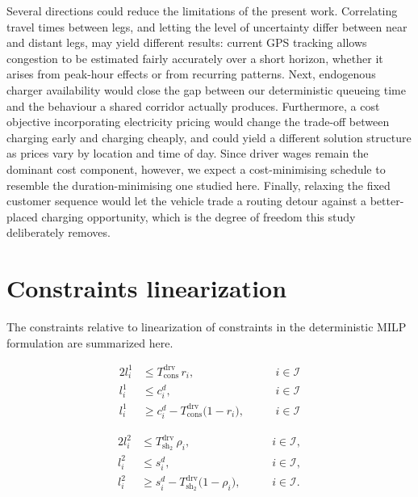 \documentclass[preprint,12pt,3p]{elsarticle}
\begin{document}
Several directions could reduce the limitations of the present work. Correlating travel times between legs, and letting the level of uncertainty differ between near and distant legs, may yield different results: current GPS tracking allows congestion to be estimated fairly accurately over a short horizon, whether it arises from peak-hour effects or from recurring patterns.
Next, endogenous charger availability would close the gap between our deterministic queueing time and the behaviour a shared corridor actually produces.
Furthermore, a cost objective incorporating electricity pricing would change the trade-off between charging early and charging cheaply, and could yield a different solution structure as prices vary by location and time of day. Since driver wages remain the dominant cost component, however, we expect a cost-minimising schedule to resemble the duration-minimising one studied here.
Finally, relaxing the fixed customer sequence would let the vehicle trade a routing detour against a better-placed charging opportunity, which is the degree of freedom this study deliberately removes.



\appendix
\section{Constraints linearization} \label{section:appendix1}
The constraints relative to linearization of constraints in the deterministic MILP formulation are summarized here.

\begin{alignat}{2}
    l_i^1 &\leq T^{\mathrm{drv}}_{\mathrm{cons}}\, r_i,
    &\quad& \, i \in \mathcal{I} \label{eq:l1_ub1}\\
    l_i^1 &\leq c_i^d,
    &\quad& \, i \in \mathcal{I} \label{eq:l1_ub2}\\
    l_i^1 &\geq c_i^d - T^{\mathrm{drv}}_{\mathrm{cons}}\bigl(1-r_i\bigr),
    &\quad& \, i \in \mathcal{I} \label{eq:l1_lb}
\end{alignat}



\begin{alignat}{2}
    l_i^2 &\leq T^{\mathrm{drv}}_{\mathrm{sh_2}}\, \rho_i,
    &\quad& \, i \in \mathcal{I}, \label{eq:l2_ub1}\\
    l_i^2 &\leq s_i^d,
    &\quad& \, i \in \mathcal{I}, \label{eq:l2_ub2}\\
    l_i^2 &\geq s_i^d - T^{\mathrm{drv}}_{\mathrm{sh_2}}\bigl(1-\rho_i\bigr),
    &\quad& \, i \in \mathcal{I}. \label{eq:l2_lb}
\end{alignat}
\end{document}
